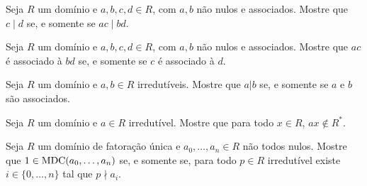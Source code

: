 \begin{exer}
    Seja $R$ um domínio e $a, b, c, d \in R$, com $a, b$ não nulos e associados. Mostre que $c\mid d$ se, e somente se $ac\mid bd$.
\end{exer}
\begin{exer}
    Seja $R$ um domínio e $a, b, c, d \in R$, com $a, b$ não nulos e associados. Mostre que $ac$ é associado à $bd$ se, e somente se $c$ é associado à $d$.
\end{exer}

\begin{exer}
    Seja $R$ um domínio e $a, b \in R$ irredutíveis. Mostre que $a|b$ se, e somente se $a$ e $b$ são associados.
\end{exer}
\begin{exer}
    Seja $R$ um domínio e $a \in R$ irredutível. Mostre que para todo $x \in R$, $ax\notin R^*$.
\end{exer}

\begin{exer}
    Seja $R$ um domínio de fatoração única e $a_0, \dots, a_n \in R$ não todos nulos. Mostre que $1 \in \operatorname{MDC}(a_0, \dots, a_n)$ se, e somente se, para todo $p \in R$ irredutível existe $i \in \{0, \dots, n\}$ tal que $p\nmid a_i$.
\end{exer}